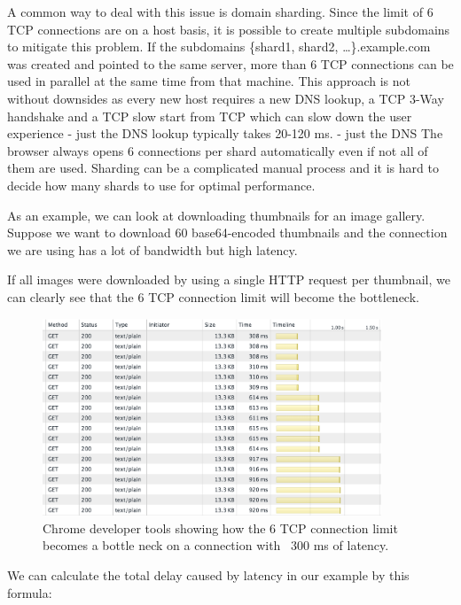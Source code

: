 \documentclass{cslthse-msc}
\begin{document}
A common way to deal with this issue is domain sharding. Since the limit of 6 TCP connections are on a host basis, it is possible to create multiple subdomains to mitigate this problem. If the subdomains \{shard1, shard2, \ldots\}.example.com was created and pointed to the same server, more than 6 TCP connections can be used in parallel at the same time from that machine. This approach is not without downsides as every new host requires a new DNS lookup, a TCP 3-Way handshake and a TCP slow start from TCP which can slow down the user experience\cite[p. 199]{HPBN} - just the DNS lookup typically takes 20-120 ms\cite[p. 63]{HPWS}. - just the DNS The browser always opens 6 connections per shard automatically even if not all of them are used. Sharding can be a complicated manual process and it is hard to decide how many shards to use for optimal performance.

As an example, we can look at downloading thumbnails for an image gallery. Suppose we want to download 60 base64-encoded thumbnails and the connection we are using has a lot of bandwidth but high latency.

If all images were downloaded by using a single HTTP request per thumbnail, we can clearly see that the 6 TCP connection limit will become the bottleneck.

\begin{figure}[H]
  \centering
    \begin{center}
      \includegraphics[width=0.9\textwidth]{images/chrome_latency_limit.png}
    \end{center}
  \caption{Chrome developer tools showing how the 6 TCP connection limit becomes a bottle neck on a connection with ~300 ms of latency.}
\end{figure}

We can calculate the total delay caused by latency in our example by this formula:
\end{document}
